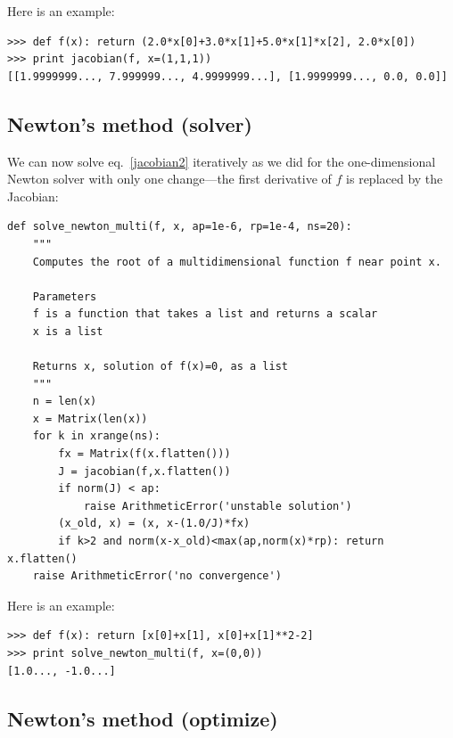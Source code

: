 \documentclass[justified,sixbynine]{tufte-book}
\def\ft{\small\tt}
\theoremstyle{plain}%
\theoremstyle{definition}
\theoremstyle{remark}
\begin{document}
\begin{fullwidth}
Here is an example:

\begin{lstlisting}[caption={in file: {\ft nlib.py}}]
>>> def f(x): return (2.0*x[0]+3.0*x[1]+5.0*x[1]*x[2], 2.0*x[0])
>>> print jacobian(f, x=(1,1,1))
[[1.9999999..., 7.999999..., 4.9999999...], [1.9999999..., 0.0, 0.0]]
\end{lstlisting}

\goodbreak\subsection{Newton's method (solver)}


We can now solve eq.~\ref{jacobian2} iteratively as we did for the one-dimensional Newton solver with only one change---the first derivative of $f$ is replaced by the Jacobian:

\begin{lstlisting}[caption={in file: {\ft nlib.py}}]
def solve_newton_multi(f, x, ap=1e-6, rp=1e-4, ns=20):
    """
    Computes the root of a multidimensional function f near point x.

    Parameters
    f is a function that takes a list and returns a scalar
    x is a list

    Returns x, solution of f(x)=0, as a list
    """
    n = len(x)
    x = Matrix(len(x))
    for k in xrange(ns):
        fx = Matrix(f(x.flatten()))
        J = jacobian(f,x.flatten())
        if norm(J) < ap:
            raise ArithmeticError('unstable solution')
        (x_old, x) = (x, x-(1.0/J)*fx)
        if k>2 and norm(x-x_old)<max(ap,norm(x)*rp): return x.flatten()
    raise ArithmeticError('no convergence')
\end{lstlisting}

Here is an example:

\begin{lstlisting}[caption={in file: {\ft nlib.py}}]
>>> def f(x): return [x[0]+x[1], x[0]+x[1]**2-2]
>>> print solve_newton_multi(f, x=(0,0))
[1.0..., -1.0...]
\end{lstlisting}

\goodbreak\subsection{Newton's method (optimize)}



\end{fullwidth}
\end{document}
